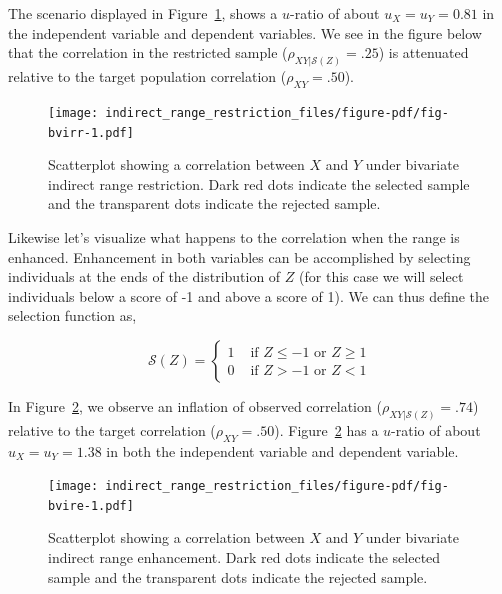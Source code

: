 \documentclass[
  letterpaper,
  DIV=11,
  numbers=noendperiod]{scrreprt}
\begin{document}
The scenario displayed in Figure~\ref{fig-bvirr}, shows a \(u\)-ratio of
about \(u_X=u_Y=0.81\) in the independent variable and dependent
variables. We see in the figure below that the correlation in the
restricted sample (\(\rho_{XY|\mathcal{S}(Z)}=.25\)) is attenuated
relative to the target population correlation (\(\rho_{XY}=.50\)).

\begin{figure}[H]

{\centering \texttt{[image: indirect\_range\_restriction\_files/figure-pdf/fig-bvirr-1.pdf]}

}

\caption{\label{fig-bvirr}Scatterplot showing a correlation between
\(X\) and \(Y\) under bivariate indirect range restriction. Dark red
dots indicate the selected sample and the transparent dots indicate the
rejected sample.}

\end{figure}

Likewise let's visualize what happens to the correlation when the range
is enhanced. Enhancement in both variables can be accomplished by
selecting individuals at the ends of the distribution of \(Z\) (for this
case we will select individuals below a score of -1 and above a score of
1). We can thus define the selection function as,

\[
\mathcal{S}(Z)=\begin{cases} 1 &\text{ if } Z \leq-1 \text{ or } Z \geq 1  \\  0 &\text{ if } Z > -1  \text{ or } Z < 1   \end{cases}
\]

In Figure~\ref{fig-bvire}, we observe an inflation of observed
correlation (\(\rho_{XY|\mathcal{S}(Z)}=.74\)) relative to the target
correlation (\(\rho_{XY}=.50\)). Figure~\ref{fig-bvire} has a
\(u\)-ratio of about \(u_X=u_Y=1.38\) in both the independent variable
and dependent variable.

\begin{figure}[H]

{\centering \texttt{[image: indirect\_range\_restriction\_files/figure-pdf/fig-bvire-1.pdf]}

}

\caption{\label{fig-bvire}Scatterplot showing a correlation between
\(X\) and \(Y\) under bivariate indirect range enhancement. Dark red
dots indicate the selected sample and the transparent dots indicate the
rejected sample.}

\end{figure}
\end{document}
